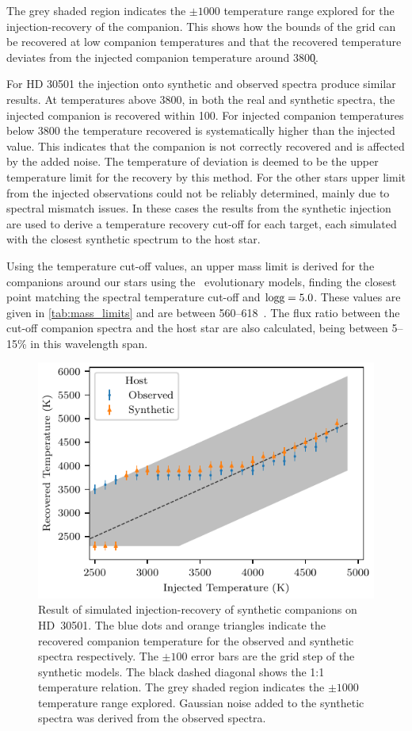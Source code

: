 The grey shaded region indicates the \(\pm 1000\)\K{} temperature range explored for the injection-recovery of the companion.
This shows how the bounds of the grid can be recovered at low companion temperatures and that the recovered temperature deviates from the injected companion temperature around 3800\k{}.

For {HD 30501} the injection onto synthetic and observed spectra produce similar results.
At temperatures above 3800\K{}, in both the real and synthetic spectra, the injected companion is recovered within 100\K{}.
For injected companion temperatures below 3800\K{} the temperature recovered is systematically higher than the injected value.
This indicates that the companion is not correctly recovered and is affected by the added noise.
The temperature of deviation is deemed to be the upper temperature limit for the recovery by this method.
For the other stars upper limit from the injected observations could not be reliably determined, mainly due to spectral mismatch issues.
In these cases the results from the synthetic injection are used to derive a temperature recovery cut-off for each target, each simulated with the closest synthetic spectrum to the host star.

Using the temperature cut-off values, an upper mass limit is derived for the companions around our stars using the~\citet{baraffe_new_2015} evolutionary models, finding the closest point matching the spectral temperature cut-off and \(\textrm{logg}{}=5.0\).
These values are given in \cref{tab:mass_limits} and are between 560--618~\Mjup{}.
The flux ratio between the cut-off companion spectra and the host star are also calculated, being between 5--15\% in this wavelength span.



\begin{figure}
    \centering
    \includegraphics[width=0.6\linewidth]{figures/companion_recovery/inject_recovery_hd30501.pdf}
    \caption[Result of simulated injection-recovery of synthetic companions on {HD~30501}.]{Result of simulated injection-recovery of synthetic companions on {HD~30501}.
        The blue dots and orange triangles indicate the recovered companion temperature for the observed and synthetic spectra respectively.
        The \(\pm100\)\K{} error bars are the grid step of the synthetic models.
        The black dashed diagonal shows the 1:1 temperature relation.
        The grey shaded region indicates the \(\pm1000\)\K{} temperature range explored.
        Gaussian noise added to the synthetic spectra was derived from the observed spectra.}
    \label{fig:injectrecoveryhd30501}
\end{figure}
